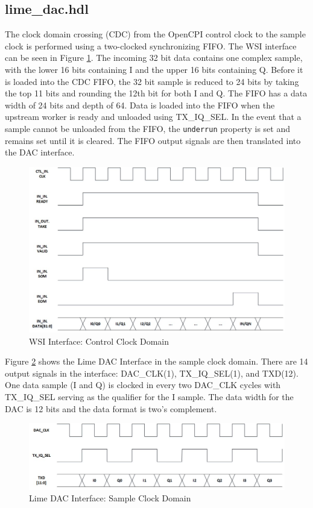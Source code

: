 \documentclass{article}
\def\comp{lime\_dac}
\begin{document}
\subsection*{\comp.hdl}
The clock domain crossing (CDC) from the OpenCPI control clock to the sample clock is performed using a two-clocked synchronizing FIFO. The WSI interface can be seen in Figure \ref{fig:ocpi_dac_interface}. The incoming 32 bit data contains one complex sample, with the lower 16 bits containing I and the upper 16 bits containing Q. Before it is loaded into the CDC FIFO, the 32 bit sample is reduced to 24 bits by taking the top 11 bits and rounding the 12th bit for both I and Q. The FIFO has a data width of 24 bits and depth of 64. Data is loaded into the FIFO when the upstream worker is ready and unloaded using TX\_IQ\_SEL. In the event that a sample cannot be unloaded from the FIFO, the \verb+underrun+ property is set and remains set until it is cleared. The FIFO output signals are then translated into the DAC interface.\par\bigskip
\begin{figure}[ht]
	\centering
	\includegraphics[scale=.5]{ocpi_dac_interface}
	\caption{WSI Interface: Control Clock Domain}
	\label{fig:ocpi_dac_interface}
\end{figure}
\noindent Figure \ref{fig:lime_dac_interface} shows the Lime DAC Interface in the sample clock domain. There are 14 output signals in the interface: DAC\_CLK(1), TX\_IQ\_SEL(1), and TXD(12). One data sample (I and Q) is clocked in every two DAC\_CLK cycles with TX\_IQ\_SEL serving as the qualifier for the I sample. The data width for the DAC is 12 bits and the data format is two's complement.\par\bigskip\bigskip
\begin{figure}[ht]
	\centering
	\includegraphics[scale=.6]{lime_dac_interface}
	\caption{Lime DAC Interface: Sample Clock Domain}
	\label{fig:lime_dac_interface}
\end{figure}
\end{document}
